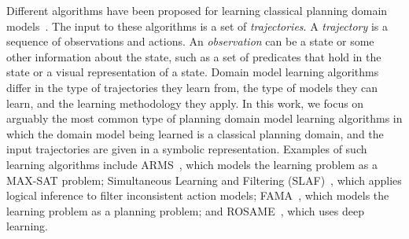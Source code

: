 \documentclass[letterpaper]{article} %
\newif\ifaddcomments
\newcommand{\todo}[1]{\ifaddcomments{\textcolor{red}{[TODO: #1]}}\fi}
\newcommand{\roni}[1]{\ifaddcomments{\textcolor{red}{[Roni: #1]}}\fi}
\newcommand{\yarin}[1]{\ifaddcomments{\textcolor{teal}{[Yarin: #1]}}\fi}
\newcommand{\cm}[1]{\ifaddcomments{\textcolor{olive}{[Christian: #1]}}\fi}
\begin{document}
Different algorithms have been proposed for learning classical planning domain models~\citep{macq,aineto2019learning,jimenez2012review}. 
The input to these algorithms is a set of \emph{trajectories}. 
A \emph{trajectory} is a sequence of observations and actions. 
An \emph{observation} can be a state or some other information about the state, 
such as a set of predicates that hold in the state or a visual representation of a state. 
Domain model learning algorithms differ in the type of trajectories they learn from, the type of models they can learn, 
and the learning methodology they apply. 
In this work, we focus on arguably the most common type of planning domain model learning algorithms in which the domain model being learned is a classical planning domain, and the input trajectories are given in a symbolic representation. 
Examples of such learning algorithms include ARMS~\citep{yang2007learning}, which models the learning problem as a MAX-SAT problem; Simultaneous Learning and Filtering (SLAF)~\citep{amir2008learning}, which applies logical inference to filter inconsistent action models; FAMA~\citep{aineto2019learning}, which models the learning problem as a planning problem; and ROSAME~\cite{xi2024neuro}, which uses deep learning. %
\end{document}
